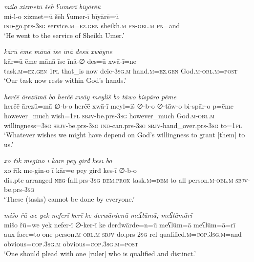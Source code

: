 \ea \label{ŠJ.83}
\textit{milo xizmetū šēh ʕumerī bīyārēū} \\ 
\gll mi-l-o xizmet=ū šēh ʕumer-ī bīyārē=ū \\ 
 \textsc{ind-}go.prs\textsc{-3sg} service\textsc{.m}\textsc{=ez.gen} sheikh\textsc{.m} \textsc{pn}\textsc{-obl}\textsc{.m} \textsc{pn}=and \\ 
\glt `He went to the service of Sheikh Umer.'
\z 
 
\ea \label{ŠJ.88}
\textit{kārū ēme mānā īse īnā desū xwāyne} \\ 
\gll kār=ū ēme mānā īse īnā-∅ des=ū xwā-ī=ne \\ 
 task\textsc{.m}\textsc{=ez.gen} \textsc{1pl} that\_is now deic\textsc{-3sg}\textsc{.m} hand\textsc{.m}\textsc{=ez.gen} God\textsc{.m}\textsc{-obl}\textsc{.m}\textsc{=\textsc{post}} \\ 
\glt `Our task now rests within God’s hands.'
\z 
 
\ea \label{ŠJ.89}
\textit{herčē ārezūmā bo herčē xwāy meyliš bo tāwo bispāro pēme} \\ 
\gll herčē ārezū=mā ∅-b-o herčē xwā-ī meyl=iš ∅-b-o ∅-tāw-o bi-spār-o p=ēme \\ 
 however\_much wish\textsc{=\textsc{1pl}} \textsc{sbjv-}be.prs\textsc{-3sg} however\_much God\textsc{.m}\textsc{-obl}\textsc{.m} willingness\textsc{=3sg} \textsc{sbjv-}be.prs\textsc{-3sg} \textsc{ind-}can.prs\textsc{-3sg} \textsc{sbjv-}hand\_over.prs\textsc{-3sg} to=\textsc{1pl} \\ 
\glt `Whatever wishes we might have depend on God’s willingness to grant [them] to us.'
\z 
 
\ea \label{ŠJ.90}
\textit{xo řīk megino ī kāre pey girđ kesī bo} \\ 
\gll xo řīk me-gin-o ī kār=e pey girđ kes-ī ∅-b-o \\ 
 dis.ptc arranged \textsc{neg-}fall.prs\textsc{-3sg} \textsc{dem.prox} task\textsc{.m}\textsc{=dem} to all person\textsc{.m}\textsc{-obl}\textsc{.m} \textsc{sbjv-}be.prs\textsc{-3sg} \\ 
\glt `These (tasks) cannot be done by everyone.'
\z 
 
\ea \label{ŠJ.92}
\textit{mišo řū we yek neferī kerī ke derwārdenū meʕlūmā; meʕlūmārī} \\ 
\gll mišo řū=we yek nefer-ī ∅-ker-ī ke derđwārde=n=ū meʕlūm=ā meʕlūm=ā=rī \\ 
 aux face=to one person\textsc{.m}\textsc{-obl}\textsc{.m} \textsc{sbjv-}do.prs-\textsc{2sg} rel qualified\textsc{.m}\textsc{=cop}\textsc{.3sg}\textsc{.m}=and obvious\textsc{=cop}\textsc{.3sg}\textsc{.m} obvious\textsc{=cop}\textsc{.3sg}\textsc{.m}\textsc{=\textsc{post}} \\ 
\glt `One should plead with one [ruler] who is qualified and distinct.'
\z 
 
